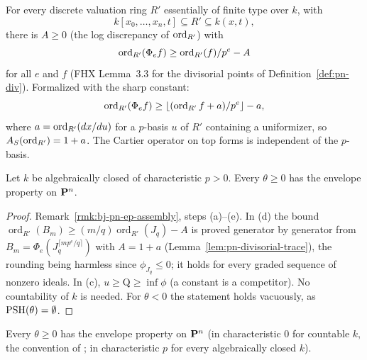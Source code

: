 \begin{lemma}\label{lem:pn-divisorial-trace}
\leanok
{}
For every discrete valuation ring $R'$ essentially of finite type over $k$, with
\[
 k[x_0,\dots,x_n,t]\subseteq R'\subseteq k(x,t),
\]
there is $A\ge0$ (the log discrepancy of $\operatorname{ord}_{R'}$) with
\[
 \operatorname{ord}_{R'}(\Phi_e f)\ge\operatorname{ord}_{R'}(f)/p^e-A
\]
for all $e$ and $f$ (FHX Lemma~3.3 for the divisorial points of
Definition~\ref{def:pn-div}). Formalized with the sharp constant:
\[
 \operatorname{ord}_{R'}(\Phi_ef)\ge\lfloor(\operatorname{ord}_{R'}f+a)/p^e\rfloor-a,
\]
where $a=\operatorname{ord}_{R'}(dx/du)$ for a $p$-basis $u$ of $R'$ containing a uniformizer,
so $A_S(\operatorname{ord}_{R'})=1+a$. The Cartier operator on top forms is independent of the $p$-basis.
\end{lemma}

\begin{theorem}\label{thm:pn-ep-charp}
\leanok
{}
Let $k$ be algebraically closed of characteristic $p>0$. Every $\theta\ge0$ has the envelope property on $\mathbf{P}^n$.
\end{theorem}

\begin{proof}
Remark~\ref{rmk:bj-pn-ep-assembly}, steps (a)--(e). In (d) the bound $\operatorname{ord}_{R'}(B_m)\ge(m/q)\operatorname{ord}_{R'}(J_q)-A$ is
proved generator by generator from $B_m=\Phi_e(J_q^{\lceil mp^e/q\rceil})$ with $A=1+a$ (Lemma~\ref{lem:pn-divisorial-trace}),
the rounding being harmless since $\phi_{J_q}\le0$; it holds for every graded sequence of nonzero ideals. In (c),
$u\ge\mathrm Q\ge\inf\phi$ (a constant is a competitor). No countability of $k$ is needed. For $\theta<0$ the
statement holds vacuously, as $\operatorname{PSH}(\theta)=\emptyset$.
\end{proof}

\begin{theorem}\label{thm:pn-ep}
\leanok
{}
Every $\theta\ge0$ has the envelope property on $\mathbf{P}^n$ (in characteristic $0$ for countable $k$, the convention of
\cite[\S5]{FHX}; in characteristic $p$ for every algebraically closed $k$).
\end{theorem}
